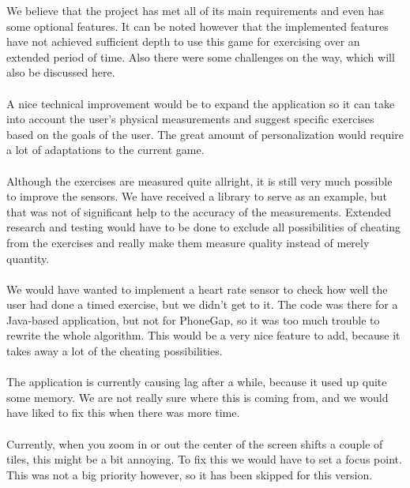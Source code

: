 We believe that the project has met all of its main requirements and even has some optional features. It can be noted however that the implemented features have not achieved sufficient depth to use this game for exercising over an extended period of time. Also there were some challenges on the way, which will also be discussed here.
\\\\
A nice technical improvement would be to expand the application so it can take into account the user’s physical measurements and suggest specific exercises based on the goals of the user. The great amount of personalization would require a lot of adaptations to the current game.
\\\\
Although the exercises are measured quite allright, it is still very much possible to improve the sensors. We have received a library to serve as an example, but that was not of significant help to the accuracy of the measurements. Extended research and testing would have to be done to exclude all possibilities of cheating from the exercises and really make them measure quality instead of merely quantity.
\\\\
We would have wanted to implement a heart rate sensor to check how well the user had done a timed exercise, but we didn't get to it. The code was there for a Java-based application, but not for PhoneGap, so it was too much trouble to rewrite the whole algorithm. This would be a very nice feature to add, because it takes away a lot of the cheating possibilities.
\\\\
The application is currently causing lag after a while, because it used up quite some memory. We are not really sure where this is coming from, and we would have liked to fix this when there was more time.
\\\\
Currently, when you zoom in or out the center of the screen shifts a couple of tiles, this might be a bit annoying. To fix this we would have to set a focus point. This was not a big priority however, so it has been skipped for this version.
